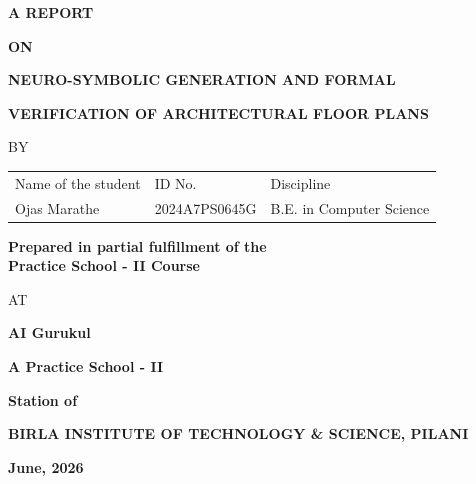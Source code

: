 \documentclass{book}
\begin{document}


\large

\thispagestyle{empty}
\centerline{\bf A REPORT}
\vspace*{0.3cm}
\centerline{\bf ON}
\vspace*{0.3cm}
\centerline{\bf NEURO-SYMBOLIC GENERATION AND FORMAL}
\vspace*{0.15cm}
\centerline{\bf VERIFICATION OF ARCHITECTURAL FLOOR PLANS}
\vspace*{2cm}

\centerline{BY}
\vspace*{1cm}

\begin{center}
	\begin{tabular}{lll}
		Name of the student & \hspace*{2cm} ID No. & \hspace*{2cm} Discipline \\
		Ojas Marathe &\hspace*{2cm} 2024A7PS0645G &\hspace*{2cm} B.E. in Computer Science \\ %
	\end{tabular}
\end{center}

\vspace*{2cm}
\begin{center}
	{\bf Prepared in partial fulfillment of the \\
	Practice School - II Course} \\
\end{center}

\vspace*{0.5cm}
\centerline{AT}
\vspace*{1cm}
\centerline{\bf AI Gurukul} %
\vspace{0.2cm}
\centerline{\bf A Practice School - II}
\vspace{0.2cm}
\centerline{\bf Station of}
\vspace{0.5cm}

\vspace{1cm}

\centerline{\bf BIRLA INSTITUTE OF TECHNOLOGY \& SCIENCE, PILANI}
\vspace*{0.5cm}
\centerline{\bf June, 2026}
\newpage
\end{document}
